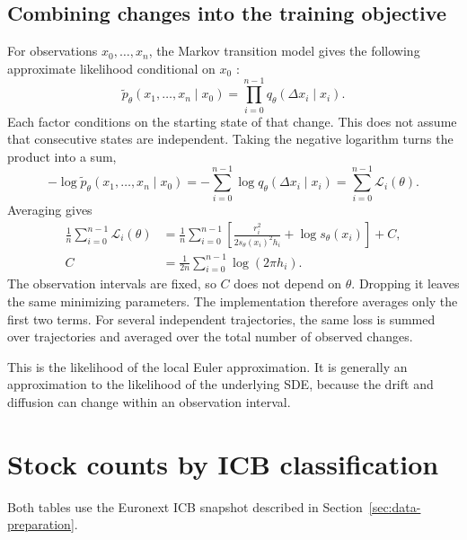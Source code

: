 \subsection{Combining changes into the training objective}

For observations $x_0,\ldots,x_n$, the Markov transition model gives the
following approximate likelihood conditional on $x_0$
\parencite{SarkkaSolin2019}:
\begin{equation}
    \widetilde{p}_\theta(x_1,\ldots,x_n\mid x_0)
       =\prod_{i=0}^{n-1}q_\theta(\Delta x_i\mid x_i).
\end{equation}
Each factor conditions on the starting state of that change. This does not
assume that consecutive states are independent. Taking the negative logarithm
turns the product into a sum,
\begin{equation}
    -\log\widetilde{p}_\theta(x_1,\ldots,x_n\mid x_0)
       =-\sum_{i=0}^{n-1}\log q_\theta(\Delta x_i\mid x_i)
       =\sum_{i=0}^{n-1}\mathcal{L}_i(\theta).
\end{equation}
Averaging gives
\begin{align*}
    \frac1n\sum_{i=0}^{n-1}\mathcal{L}_i(\theta)
       &=\frac1n\sum_{i=0}^{n-1}
          \left[\frac{r_i^2}{2s_\theta(x_i)^2h_i}
                     +\log s_\theta(x_i)\right]+C,\\
    C&=\frac{1}{2n}\sum_{i=0}^{n-1}\log(2\pi h_i).
\end{align*}
The observation intervals are fixed, so $C$ does not depend on $\theta$.
Dropping it leaves the same minimizing parameters. The implementation
therefore averages only the first two terms. For several independent
trajectories, the same loss is summed over trajectories and averaged over
the total number of observed changes.

This is the likelihood of the local Euler approximation. It is generally
an approximation to the likelihood of the underlying SDE, because the drift
and diffusion can change within an observation interval.

\clearpage

\section{Stock counts by ICB classification}
\label{app:icb-sample-composition}

Both tables use the Euronext ICB snapshot described in
Section~\ref{sec:data-preparation}.

